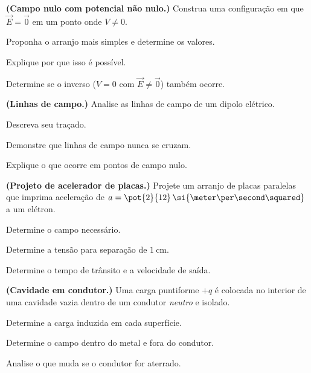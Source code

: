 \blocodesafio
\begin{questao}[4]{}

\textbf{(Campo nulo com potencial não nulo.)} Construa uma configuração em que
$\vec E=\vec0$ em um ponto onde $V\ne0$.
\begin{itensq}
\item Proponha o arranjo mais simples e determine os valores.
\item Explique por que isso é possível.
\item Determine se o inverso ($V=0$ com $\vec E\ne\vec0$) também ocorre.
\end{itensq}


\end{questao}
\begin{questao}[4]{}

\textbf{(Linhas de campo.)} Analise as linhas de campo de um dipolo elétrico.
\begin{itensq}
\item Descreva seu traçado.
\item Demonstre que linhas de campo nunca se cruzam.
\item Explique o que ocorre em pontos de campo nulo.
\end{itensq}


\end{questao}
\begin{questao}[4]{}

\textbf{(Projeto de acelerador de placas.)} Projete um arranjo de placas
paralelas que imprima aceleração de
$a=\pot{2}{12}\,\si{\meter\per\second\squared}$ a um elétron.
\begin{itensq}
\item Determine o campo necessário.
\item Determine a tensão para separação de $\SI{1}{\centi\meter}$.
\item Determine o tempo de trânsito e a velocidade de saída.
\end{itensq}


\end{questao}
\begin{questao}[4]{}

\textbf{(Cavidade em condutor.)} Uma carga puntiforme $+q$ é colocada no
interior de uma cavidade vazia dentro de um condutor \emph{neutro} e isolado.
\begin{itensq}
\item Determine a carga induzida em cada superfície.
\item Determine o campo dentro do metal e fora do condutor.
\item Analise o que muda se o condutor for aterrado.
\end{itensq}


\end{questao}
